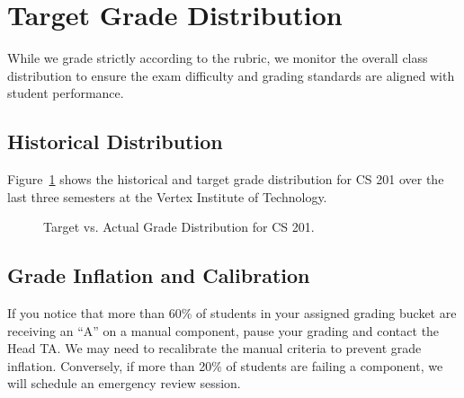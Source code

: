 \section{Target Grade Distribution}
While we grade strictly according to the rubric, we monitor the overall class distribution to ensure the exam difficulty and grading standards are aligned with student performance.

\subsection{Historical Distribution}
Figure~\ref{fig:grade_dist} shows the historical and target grade distribution for CS 201 over the last three semesters at the Vertex Institute of Technology.

\begin{figure}[H]
    \centering
    \caption{Target vs. Actual Grade Distribution for CS 201.}
    \label{fig:grade_dist}
\end{figure}

\subsection{Grade Inflation and Calibration}
If you notice that more than 60\% of students in your assigned grading bucket are receiving an ``A'' on a manual component, pause your grading and contact the Head TA. We may need to recalibrate the manual criteria to prevent grade inflation. Conversely, if more than 20\% of students are failing a component, we will schedule an emergency review session.

